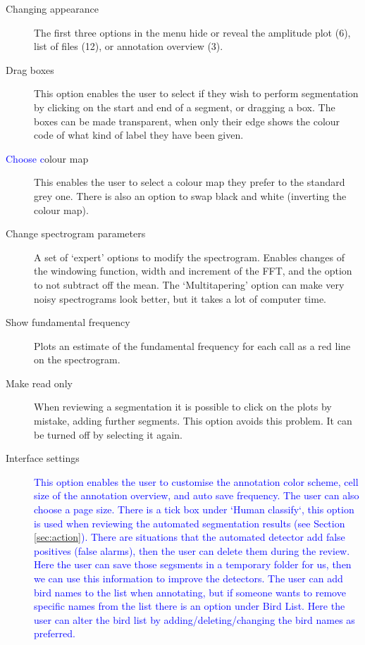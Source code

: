 \documentclass{article}
\begin{document}
\begin{description}
\item [Changing appearance] The first three options in the menu hide or reveal the amplitude plot (6), list of files (12), or annotation overview (3). 
\item [Drag boxes] This option enables the user to select if they wish to perform segmentation by clicking on the start and end of a segment, or dragging a box. The boxes can be made transparent, when only their edge shows the colour code of what kind of label they have been given.
\item [\textcolor{blue}{Choose c}olour map] This enables the user to select a colour map they prefer to the standard grey one. There is also an option to swap black and white (inverting the colour map). 
\item [Change spectrogram parameters] A set of `expert' options to modify the spectrogram. Enables changes of the windowing function, width and increment of the FFT, and the option to not subtract off the mean. The `Multitapering' option can make very noisy spectrograms look better, but it takes a lot of computer time. 
\item [Show fundamental frequency] Plots an estimate of the fundamental frequency for each call as a red line on the spectrogram.
\item [Make read only] When reviewing a segmentation it is possible to click on the plots by mistake, adding further segments. This option avoids this problem. It can be turned off by selecting it again. 
\item [Interface settings] \textcolor{blue}{This option enables the user to customise the annotation color scheme, cell size of the annotation overview, and auto save frequency. The user can also choose a page size. There is a tick box under `Human classify`, this option is used when reviewing the automated segmentation results  (see Section \ref{sec:action}).  There are situations that the automated detector add false positives (false alarms), then the user can delete them during the review. Here the user can save those segsments in a temporary folder for us, then we can use this information to improve the detectors. The user can add bird names to the list when annotating, but if someone wants to remove specific names from the list there is an option under Bird List. Here the user can alter the bird list by adding/deleting/changing the bird names as preferred. } 
\end{description}
\end{document}
